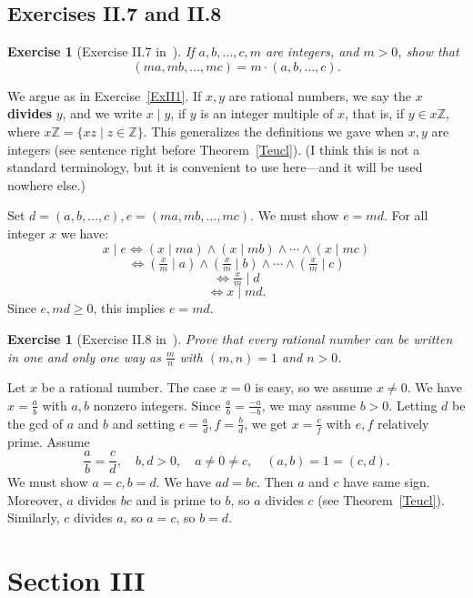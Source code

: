 \documentclass[12pt,letterpaper]{article}
\newcommand{\Z}{\mathbb{Z}}
\newtheorem{exer}[thm]{Exercise}
\theoremstyle{definition}
\begin{document}

\subsection{Exercises II.7 and II.8} %

\begin{exer}[Exercise II.7 in~\cite{weil1979}]
If $a,b,\ldots,c,m$ are integers, and $m>0$, show that
\[
(ma,mb,\ldots,mc)=m\cdot(a,b,\ldots,c).
\]
\end{exer} 

We argue as in Exercise~\ref{ExII1}. If $x,y$ are rational numbers, we say the $x$ \textbf{divides} $y$, and we write $x\mid y$, if $y$ is an integer multiple of $x$, that is, if $y\in x\Z$, where $x\Z=\{xz\mid z\in\Z\}$. This generalizes the definitions we gave when $x,y$ are integers (see sentence right before Theorem~\ref{Teucl}). (I think this is not a standard terminology, but it is convenient to use here---and it will be used nowhere else.)

Set $d=(a,b,\ldots,c), e=(ma,mb,\ldots,mc)$. We must show $e=md$. For all integer $x$ we have: 
$$
x\mid e\iff(x\mid ma)\land(x\mid mb)\land\cdots\land(x\mid mc)
$$ 
$$
\iff(\tfrac{x}{m}\mid a)\land(\tfrac{x}{m}\mid b)\land\cdots\land(\tfrac{x}{m}\mid c)
$$ 
$$
\iff\tfrac{x}{m}\mid d
$$ 
$$
\iff x\mid md.
$$ 
Since $e,md\ge0$, this implies $e=md$. 

\begin{exer}[Exercise II.8 in~\cite{weil1979}]\label{ExII8}
Prove that every rational number can be written in one and only one way as $\frac{m}{n}$ with $(m,n)=1$ and $n>0$. 
\end{exer} 

Let $x$ be a rational number. The case $x=0$ is easy, so we assume $x\ne 0$. We have $x=\frac{a}{b}$ with $a, b$ nonzero integers. Since $\frac{a}{b}=\frac{-a}{-b}$, we may assume $b>0$. Letting $d$ be the gcd of $a$ and $b$ and setting $e=\frac{a}{d}, f=\frac{b}{d}$, we get $x=\frac{e}{f}$ with $e,f$ relatively prime. Assume 
$$
\frac{a}{b}=\frac{c}{d},\quad b,d>0,\quad a\ne0\ne c,\quad (a,b)=1=(c,d).
$$ 
We must show $a=c,b=d$. We have $ad=bc$. Then $a$ and $c$ have same sign. Moreover, $a$ divides $bc$ and is prime to $b$, so $a$ divides $c$ (see Theorem~\ref{Teucl}). Similarly, $c$ divides $a$, so $a=c$, so $b=d$. 

\section{Section III} 
\end{document}
